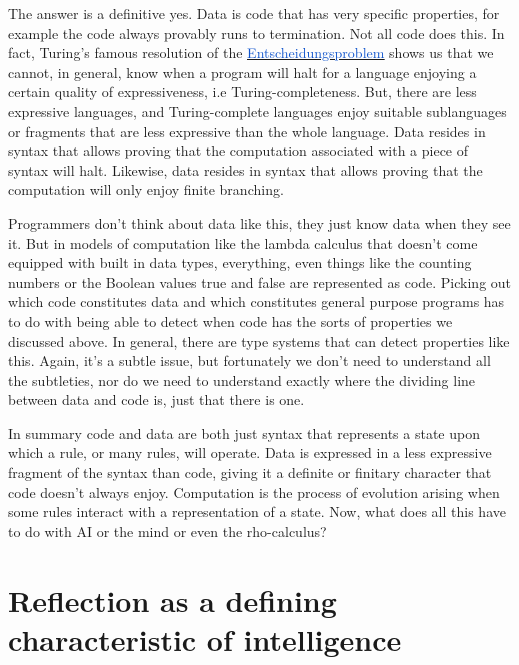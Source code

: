\documentclass[runningheads]{llncs}
\begin{document}
\vspace{1\baselineskip}
The answer is a definitive yes. Data is code that has very specific properties, for example the code always provably runs to termination. Not all code does this. In fact, Turing’s famous resolution of the \href{https://en.wikipedia.org/wiki/Entscheidungsproblem}{\uline{\textcolor[HTML]{1155CC}{Entscheidungsproblem}}} shows us that we cannot, in general, know when a program will halt for a language enjoying a certain quality of expressiveness, i.e Turing-completeness. But, there are less expressive languages, and Turing-complete languages enjoy suitable sublanguages or fragments that are less expressive than the whole language. Data resides in syntax that allows proving that the computation associated with a piece of syntax will halt. Likewise, data resides in syntax that allows proving that the computation will only enjoy finite branching. 

\vspace{1\baselineskip}
Programmers don’t think about data like this, they just know data when they see it. But in models of computation like the lambda calculus that doesn’t come equipped with built in data types, everything, even things like the counting numbers or the Boolean values true and false are represented as code. Picking out which code constitutes data and which constitutes general purpose programs has to do with being able to detect when code has the sorts of properties we discussed above. In general, there are type systems that can detect properties like this. Again, it’s a subtle issue, but fortunately we don’t need to understand all the subtleties, nor do we need to understand exactly where the dividing line between data and code is, just that there is one. 

\vspace{1\baselineskip}
In summary code and data are both just syntax that represents a state upon which a rule, or many rules, will operate. Data is expressed in a less expressive fragment of the syntax than code, giving it a definite or finitary character that code doesn’t always enjoy. Computation is the process of evolution arising when some rules interact with a representation of a state. Now, what does all this have to do with AI or the mind or even the rho-calculus?

\vspace{1\baselineskip}
\section{Reflection as a defining characteristic of intelligence}
\end{document}
